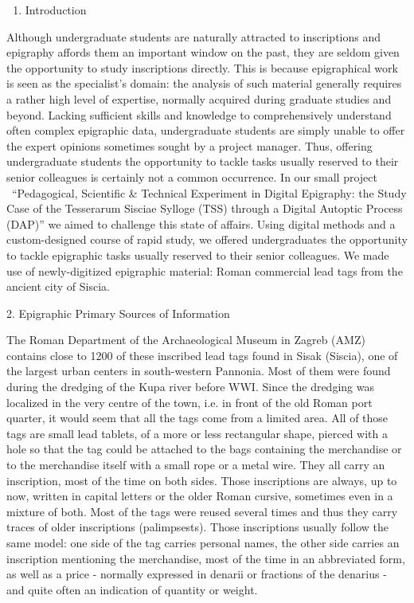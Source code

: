 \documentclass[amsthm,ebook]{saparticle}
\begin{document}
\begin{enumerate}
\item Introduction
\end{enumerate}
Although undergraduate students are naturally attracted to inscriptions and epigraphy affords them an important window
on the past, they are seldom given the opportunity to study inscriptions directly. This is because epigraphical work is
seen as the specialist’s domain: the analysis of such material generally requires a rather high level of expertise,
normally acquired during graduate studies and beyond. Lacking sufficient skills and knowledge to comprehensively
understand often complex epigraphic data, undergraduate students are simply unable to offer the expert opinions
sometimes sought by a project manager. Thus, offering undergraduate students the opportunity to tackle tasks usually
reserved to their senior colleagues is certainly not a common occurrence. In our small project \ “Pedagogical,
Scientific \& Technical Experiment in Digital Epigraphy: the Study Case of the Tesserarum Sisciae Sylloge (TSS) through
a Digital Autoptic Process (DAP)” we aimed to challenge this state of affairs. Using digital methods and a
custom-designed course of rapid study, we offered undergraduates the opportunity to tackle epigraphic tasks usually
reserved to their senior colleagues. We made use of newly-digitized epigraphic material: Roman commercial lead tags
from the ancient city of Siscia.

2. Epigraphic Primary Sources of Information

The Roman Department of the Archaeological Museum in Zagreb (AMZ) contains close to 1200 of these inscribed lead tags
found in Sisak (Siscia), one of the largest urban centers in south-western Pannonia. Most of them were found during the
dredging of the Kupa river before WWI. Since the dredging was localized in the very centre of the town, i.e. in front
of the old Roman port quarter, it would seem that all the tags come from a limited area. All of those tags are small
lead tablets, of a more or less rectangular shape, pierced with a hole so that the tag could be attached to the bags
containing the merchandise or to the merchandise itself with a small rope or a metal wire. They all carry an
inscription, most of the time on both sides. Those inscriptions are always, up to now, written in capital letters or
the older Roman cursive, sometimes even in a mixture of both. Most of the tags were reused several times and thus they
carry traces of older inscriptions (palimpsests). Those inscriptions usually follow the same model: one side of the tag
carries personal names, the other side carries an inscription mentioning the merchandise, most of the time in an
abbreviated form, as well as a price - normally expressed in denarii or fractions of the denarius - and quite often an
indication of quantity or weight.
\end{document}
